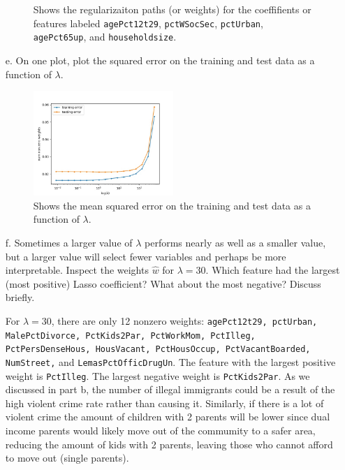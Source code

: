 \documentclass[shortlabels]{article}
\begin{document}
\begin{aprob}
\begin{enumerate}
\begin{figure}[h]
            \caption{Shows the regularizaiton paths (or weights) for the coeffifients or features labeled 
            \texttt{agePct12t29}, \texttt{pctWSocSec}, \texttt{pctUrban}, \texttt{agePct65up}, and \texttt{householdsize}.}
            \label{fig:regularizationpaths}
        \end{figure}
        \newpage
        \item[e.]  On one plot, plot the squared error on the training and test data as a function of $\lambda$.
        \begin{figure}[h]
            \centering
            \includegraphics[width=0.5\textwidth]{../hw2-code/lambda_vs_sq-er.jpg}
            \caption{Shows the mean squared error on the training and test data as a function of $\lambda$.}
            \label{fig:squared_error}
        \end{figure}
        \newpage
        \item[f.]  Sometimes a larger value of $\lambda$ performs nearly as well as a smaller value, but a larger value will select fewer variables and perhaps be more interpretable.  Inspect the weights $\hat{w}$ for $\lambda = 30$.  Which feature had the largest (most positive) Lasso coefficient? What about the most negative? Discuss briefly.
        
        For $\lambda = 30$, there are only 12 nonzero weights: \texttt{agePct12t29, pctUrban, MalePctDivorce, PctKids2Par,
        PctWorkMom, PctIlleg, PctPersDenseHous, HousVacant,
        PctHousOccup, PctVacantBoarded, NumStreet,} and \texttt{LemasPctOfficDrugUn}. The feature with the largest positive weight is \texttt{PctIlleg}.
        The largest negative weight is \texttt{PctKids2Par}. As we discussed in part b, the number of illegal immigrants could be a result of the high violent crime rate rather than causing it. Similarly, if there is a lot of violent crime the amount of children with 2 parents will be lower since dual income parents would likely move out of the commumity to a safer area, reducing the amount of kids with 2 parents, leaving those who cannot afford to move out (single parents).
        

\end{enumerate}
\end{aprob}
\end{document}
